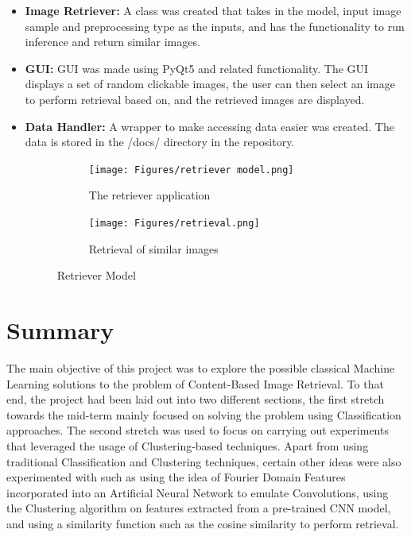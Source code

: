 \documentclass[a4paper]{article}
\theoremstyle{plain}
\theoremstyle{definition}
\begin{document}
{\begin{itemize}
    
    \item[] \textbf{Image Retriever:} A class was created that takes in the model, input image sample and preprocessing type as the inputs, and has the functionality to run inference and return similar images.
    
    \item[] \textbf{GUI:} GUI was made using PyQt5 and related functionality. The GUI displays a set of random clickable images, the user can then select an image to perform retrieval based on, and the retrieved images are displayed.
    
    \item[] \textbf{Data Handler:} A wrapper to make accessing data easier was created. The data is stored in the /docs/ directory in the repository.
    \newline
    
\begin{figure}[H]
\begin{subfigure}{0.4\textwidth} %
  \centering
  \texttt{[image: Figures/retriever model.png]}
  \captionsetup{font=scriptsize} %
  \caption {The retriever application}
  \label{fig:r2}
\end{subfigure}
\hfill %
\begin{subfigure}{0.32\textwidth} %
  \centering
  \texttt{[image: Figures/retrieval.png]}
  \captionsetup{font=scriptsize} %
  \caption{Retrieval of similar images}
  \label{fig:r3}
\end{subfigure}
\caption{Retriever Model}
\label{fig:retrieverr}
\end{figure}
\end{itemize}

	\newpage
\section{Summary}
\label{sec:app}
The main objective of this project was to explore the possible classical Machine Learning solutions to the problem of Content-Based Image Retrieval. To that end, the project had been laid out into two different sections, the first stretch towards the mid-term mainly focused on solving the problem using Classification approaches. The second stretch was used to focus on carrying out experiments that leveraged the usage of Clustering-based techniques. Apart from using traditional Classification and Clustering techniques, certain other ideas were also experimented with such as using the idea of Fourier Domain Features incorporated into an Artificial Neural Network to emulate Convolutions, using the Clustering algorithm on features extracted from a pre-trained CNN model, and using a similarity function such as the cosine similarity to perform retrieval.

}
\end{document}
